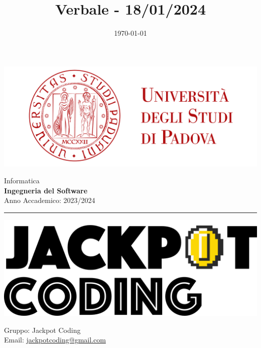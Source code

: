 \documentclass[5pt]{article}
\title{ Verbale - 18/01/2024 }
\date{\today}
\begin{document}


	\vspace{8pt}
	\includegraphics[scale=0.2]{UNIPDFull.png}

	\vspace{10pt}

	\begin{minipage}[t]{0.48\textwidth}
		\begin{flushleft}
			Informatica\\
			\vspace{5pt}
			\textbf{\LARGE Ingegneria del Software}\\
			Anno Accademico: 2023/2024
		\end{flushleft}
	\end{minipage}


	\vspace{5px}


	\rule{\textwidth}{5pt}

	\begin{minipage}[t]{0.50\textwidth}
		\begin{flushleft}
			\hspace{10pt}
			\includegraphics[scale=0.65]{jackpot-logo.png} 
		\end{flushleft}
	\end{minipage}
	\hspace{-60pt} %
	\begin{flushright}
		\begin{minipage}[t]{0.50\textwidth}
			\begin{flushright}
				Gruppo: {\Large Jackpot Coding}\\
				Email: \href{mailto:jackpotcoding@gmail.com}{jackpotcoding@gmail.com}
			\end{flushright}
		\end{minipage}
	\end{flushright}
\end{document}

